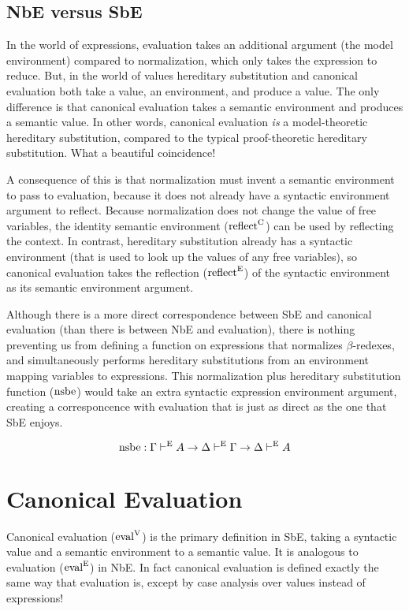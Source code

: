 \documentclass{llncs}
\def\marr{\rightarrow}
\def\reflecte{\fun{reflect}^\con{E}}
\def\reflectc{\fun{reflect}^\con{C}}
\def\eval{\fun{eval}^\con{E}}
\def\cevalv{\fun{eval}^\con{V}}
\def\nsbe{\fun{nsbe}}
\newcommand{\turn}[1]{\vdash^\con{#1}}
\newcommand{\con}[1]{\textmd{#1}}
\newcommand{\fun}[1]{\textmd{#1}}
\newcommand{\type}[1]{\Gamma \turn{E} #1}
\newcommand{\dtype}[1]{\Delta \turn{E} #1}
\def\enve{\Delta \turn{E} \Gamma}
\begin{document}
\subsection{NbE versus SbE}

In the world of expressions,
evaluation takes an additional argument (the model environment) compared
to normalization, which only takes the expression to reduce. But, in
the world of values hereditary substitution and canonical evaluation
both take a value, an environment, and produce a value. The only
difference is that canonical evaluation takes a semantic environment and
produces a semantic value. 
In other words, canonical evaluation \textit{is}
a model-theoretic hereditary substitution, compared to the typical
proof-theoretic hereditary substitution.
What a beautiful coincidence!

A consequence of this is that normalization must invent a semantic
environment to pass to evaluation, because it does not already
have a syntactic environment argument to reflect. Because normalization does not
change the value of free variables, the identity semantic environment
($\reflectc$) can be used by reflecting the context. In contrast, hereditary substitution already has
a syntactic environment (that is used to look up the values of any free
variables), so canonical evaluation takes the 
reflection ($\reflecte$) of the syntactic environment as its semantic
environment argument.

Although there is a more direct correspondence between SbE and canonical
evaluation (than there is between NbE and evaluation), there is
nothing preventing us from defining a function on expressions that
normalizes $\beta$-redexes, and simultaneously performs hereditary
substitutions from an environment mapping variables to expressions.
This normalization plus hereditary substitution function ($\nsbe$) would take an
extra syntactic expression environment argument, creating a
corresponcence with evaluation that is just as direct as the one that
SbE enjoys.

$$
\nsbe : \type{A} \marr \enve \marr \dtype{A}
$$


\section{Canonical Evaluation}
\label{sec:ceval}

Canonical evaluation ($\cevalv$) is the primary definition in SbE, taking a
syntactic value and a semantic environment to a semantic value. It is
analogous to evaluation ($\eval$) in NbE. In fact canonical evaluation
is defined exactly the same way that evaluation is, except by case
analysis over values instead of expressions!
\end{document}
